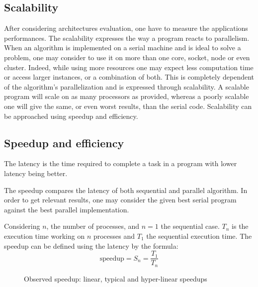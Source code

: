 \subsection{Scalability}

After considering architectures evaluation, one have to measure the applications performances.
The scalability expresses the way a program reacts to parallelism. 
When an algorithm is implemented on a serial machine and is ideal to solve a problem, one may consider to use it on more than one core, socket, node or even cluster. 
Indeed, while using more resources one may expect less computation time or access larger instances, or a combination of both. 
This is completely dependent of the algorithm's parallelization and is expressed through scalability. 
A scalable program will scale on as many processors as provided, whereas a poorly scalable one will give the same, or even worst results, than the serial code.  
Scalability can be approached using speedup and efficiency.

\subsection{Speedup and efficiency}
The latency is the time required to complete a task in a program with lower latency being better. 

The speedup compares the latency of both sequential and parallel algorithm. 
In order to get relevant results, one may consider the given best serial program against the best parallel implementation.

Considering $n$, the number of processes, and $n=1$ the sequential case.
$T_n$ is the execution time working on $n$ processes and $T_1$ the sequential execution time. 
The speedup can be defined using the latency by the formula: 
\begin{equation}
\text{speedup} = S_n =  \frac{T_1}{T_n}
\end{equation}

\begin{figure}
\centering 
{}
\caption{Observed speedup: linear, typical and hyper-linear speedups}
\label{fig:1_HPC:speedup_obs}
\end{figure}


